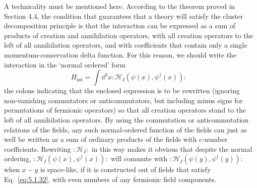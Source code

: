 A technicality must be mentioned here. According to the theorem proved in
Section 4.4, the condition that guarantees that a theory will satisfy the
cluster decomposition principle is that the interaction can be expressed as a
sum of products of creation and annihilation operators, with all creation
operators to the left of all annihilation operators, and with coefficients
that contain only a single momentum-conservation delta function. For this
reason, we should write the interaction in the `normal ordered' form
\begin{equation}
  H_{\mathrm{int}}=\int \dd^3x:\!\mathcal{H}_I
  (\psi(x),\psi^\dagger(x))\!:
  \tag{5.1.35}\label{eq:5.1.35}
\end{equation}
the colons indicating that the enclosed expression is to be rewritten
(ignoring non-vanishing commutators or anticommutators, but including minus
signs for permutations of fermionic operators) so that all creation operators
stand to the left of all annihilation operators. By using the commutation or
anticommutation relations of the fields, any such normal-ordered function of
the fields can just as well be written as a sum of ordinary products of the
fields with c-number coefficients. Rewriting
$:\!\mathcal{H}_I\!:$ in this way makes it obvious that despite the normal
ordering, $:\!\mathcal{H}_I(\psi(x),\psi^\dagger(x))\!:$ will commute with
$:\!\mathcal{H}_I(\psi(y),\psi^\dagger(y))\!:$ when $x-y$ is space-like,
if it is constructed out of fields that satisfy Eq.~\eqref{eq:5.1.32}, with even numbers
of any fermionic field components.
